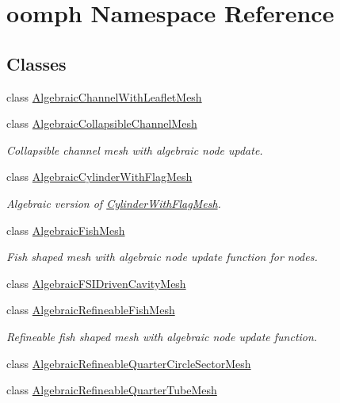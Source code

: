 \hypertarget{namespaceoomph}{}\section{oomph Namespace Reference}
\label{namespaceoomph}
\subsection*{Classes}
\begin{DoxyCompactItemize}
\item 
class \hyperlink{classoomph_1_1AlgebraicChannelWithLeafletMesh}{Algebraic\+Channel\+With\+Leaflet\+Mesh}
\item 
class \hyperlink{classoomph_1_1AlgebraicCollapsibleChannelMesh}{Algebraic\+Collapsible\+Channel\+Mesh}
\begin{DoxyCompactList}\small\item\em Collapsible channel mesh with algebraic node update. \end{DoxyCompactList}\item 
class \hyperlink{classoomph_1_1AlgebraicCylinderWithFlagMesh}{Algebraic\+Cylinder\+With\+Flag\+Mesh}
\begin{DoxyCompactList}\small\item\em Algebraic version of \hyperlink{classoomph_1_1CylinderWithFlagMesh}{Cylinder\+With\+Flag\+Mesh}. \end{DoxyCompactList}\item 
class \hyperlink{classoomph_1_1AlgebraicFishMesh}{Algebraic\+Fish\+Mesh}
\begin{DoxyCompactList}\small\item\em Fish shaped mesh with algebraic node update function for nodes. \end{DoxyCompactList}\item 
class \hyperlink{classoomph_1_1AlgebraicFSIDrivenCavityMesh}{Algebraic\+F\+S\+I\+Driven\+Cavity\+Mesh}
\item 
class \hyperlink{classoomph_1_1AlgebraicRefineableFishMesh}{Algebraic\+Refineable\+Fish\+Mesh}
\begin{DoxyCompactList}\small\item\em Refineable fish shaped mesh with algebraic node update function. \end{DoxyCompactList}\item 
class \hyperlink{classoomph_1_1AlgebraicRefineableQuarterCircleSectorMesh}{Algebraic\+Refineable\+Quarter\+Circle\+Sector\+Mesh}
\item 
class \hyperlink{classoomph_1_1AlgebraicRefineableQuarterTubeMesh}{Algebraic\+Refineable\+Quarter\+Tube\+Mesh}

\end{DoxyCompactItemize}
